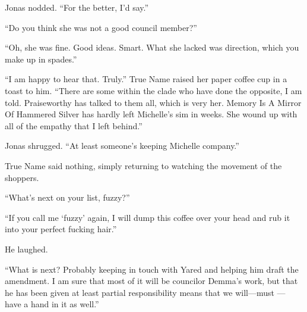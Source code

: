 Jonas nodded. ``For the better, I'd say.''

``Do you think she was not a good council member?''

``Oh, she was fine. Good ideas. Smart. What she lacked was direction, which you make up in spades.''

``I am happy to hear that. Truly.'' True Name raised her paper coffee cup in a toast to him. ``There are some within the clade who have done the opposite, I am told. Praiseworthy has talked to them all, which is very her. Memory Is A Mirror Of Hammered Silver has hardly left Michelle's sim in weeks. She wound up with all of the empathy that I left behind.''

Jonas shrugged. ``At least someone's keeping Michelle company.''

True Name said nothing, simply returning to watching the movement of the shoppers.

``What's next on your list, fuzzy?''

``If you call me `fuzzy' again, I will dump this coffee over your head and rub it into your perfect fucking hair.''

He laughed.

``What is next? Probably keeping in touch with Yared and helping him draft the amendment. I am sure that most of it will be councilor Demma's work, but that he has been given at least partial responsibility means that we will---must — have a hand in it as well.''
